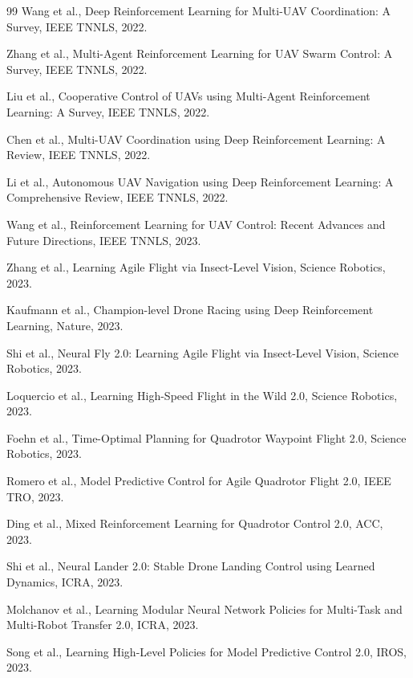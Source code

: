 \documentclass[12pt,a4paper]{ctexart}
\begin{document}
\begin{thebibliography}{99}
 Wang et al., Deep Reinforcement Learning for Multi-UAV Coordination: A Survey, IEEE TNNLS, 2022.

 Zhang et al., Multi-Agent Reinforcement Learning for UAV Swarm Control: A Survey, IEEE TNNLS, 2022.

 Liu et al., Cooperative Control of UAVs using Multi-Agent Reinforcement Learning: A Survey, IEEE TNNLS, 2022.

 Chen et al., Multi-UAV Coordination using Deep Reinforcement Learning: A Review, IEEE TNNLS, 2022.

 Li et al., Autonomous UAV Navigation using Deep Reinforcement Learning: A Comprehensive Review, IEEE TNNLS, 2022.

 Wang et al., Reinforcement Learning for UAV Control: Recent Advances and Future Directions, IEEE TNNLS, 2023.

 Zhang et al., Learning Agile Flight via Insect-Level Vision, Science Robotics, 2023.

 Kaufmann et al., Champion-level Drone Racing using Deep Reinforcement Learning, Nature, 2023.

 Shi et al., Neural Fly 2.0: Learning Agile Flight via Insect-Level Vision, Science Robotics, 2023.

 Loquercio et al., Learning High-Speed Flight in the Wild 2.0, Science Robotics, 2023.

 Foehn et al., Time-Optimal Planning for Quadrotor Waypoint Flight 2.0, Science Robotics, 2023.

 Romero et al., Model Predictive Control for Agile Quadrotor Flight 2.0, IEEE TRO, 2023.

 Ding et al., Mixed Reinforcement Learning for Quadrotor Control 2.0, ACC, 2023.

 Shi et al., Neural Lander 2.0: Stable Drone Landing Control using Learned Dynamics, ICRA, 2023.

 Molchanov et al., Learning Modular Neural Network Policies for Multi-Task and Multi-Robot Transfer 2.0, ICRA, 2023.

 Song et al., Learning High-Level Policies for Model Predictive Control 2.0, IROS, 2023.


\end{thebibliography}
\end{document}
